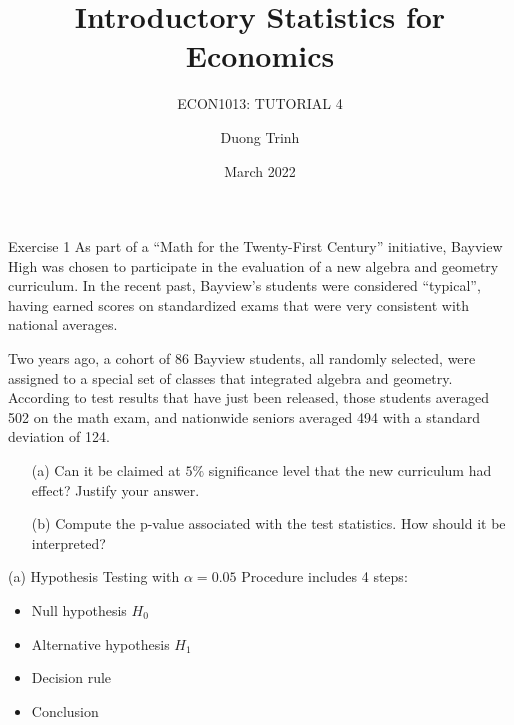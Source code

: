 \documentclass[
  10pt,
  ignorenonframetext,
]{beamer}
\title{Introductory Statistics for Economics}
\subtitle{ECON1013: TUTORIAL 4}
\author{Duong Trinh}
\date{March 2022}
\institute{University of Glasgow}
\begin{document}
\frame{\titlepage}

\begin{frame}{Exercise 1}
\protect\hypertarget{exercise-1}{}
As part of a ``Math for the Twenty-First Century'' initiative, Bayview
High was chosen to participate in the evaluation of a new algebra and
geometry curriculum. In the recent past, Bayview's students were
considered ``typical'', having earned scores on standardized exams that
were very consistent with national averages.

Two years ago, a cohort of 86 Bayview students, all randomly selected,
were assigned to a special set of classes that integrated algebra and
geometry. According to test results that have just been released, those
students averaged 502 on the math exam, and nationwide seniors averaged
494 with a standard deviation of 124.

\begin{enumerate}
  \item [(a)] Can it be claimed at $5\%$ significance level that the new curriculum had effect? Justify your answer.
  \item [(b)] Compute the p-value associated with the test statistics. How should it be interpreted? 
\end{enumerate}
\end{frame}

\begin{frame}{(a) Hypothesis Testing with \(\alpha = 0.05\)}
\protect\hypertarget{a-hypothesis-testing-with-alpha-0.05}{}
Procedure includes 4 steps: \vspace{1.5mm}

\begin{itemize}
    \item Null hypothesis $H_0$
    \vspace{1.5mm}
    \item Alternative hypothesis $H_1$
    \vspace{1.5mm}
    \item Decision rule
    \vspace{1.5mm}
    \item Conclusion
\end{itemize}
\end{frame}
\end{document}
